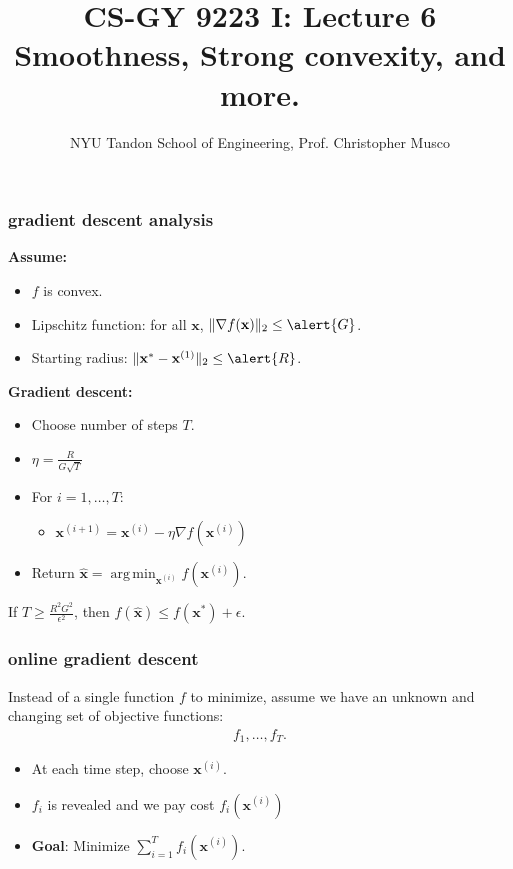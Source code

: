 \documentclass[compress]{beamer}
\title{CS-GY 9223 I: Lecture 6 \\ Smoothness, Strong convexity, and more.}
\author{NYU Tandon School of Engineering, Prof. Christopher Musco}
\date{}
\newcommand{\bv}[1]{\mathbf{#1}}
\DeclareMathOperator*{\argmin}{arg\,min}
\begin{document}
\begin{frame}
	\titlepage 
\end{frame}


\begin{frame}[t]
	\frametitle{gradient descent analysis}
	\textbf{Assume:}
	\begin{itemize}
		\item $f$ is convex.
		\item Lipschitz function: for all $\bv{x}$, $\|\nabla f(\bv{x})\|_2 \leq \alert{G}$.
		\item Starting radius: $\|\bv{x}^{*} - \bv{x}^{(1)}\|_2 \leq \alert{R}$.
	\end{itemize}
	
	\textbf{Gradient descent:}
	\begin{itemize}
		\item Choose number of steps $T$.
		\item $\eta = \frac{R}{G\sqrt{T}}$
		\item For $i = 1,\ldots, T$:
		\begin{itemize}
			\item $\bv{x}^{(i+1)} = \bv{x}^{(i)} - \eta \nabla f(\bv{x}^{(i)})$
		\end{itemize}
		\item Return $\hat{\bv{x}} = \argmin_{\bv{x}^{(i)}} f(\bv{x}^{(i)})$.
	\end{itemize}
	\begin{theorem}
	If $T \geq \frac{R^2G^2}{\epsilon^2}$, then $f(\hat{\bv{x}}) \leq f(\bv{x}^*) + \epsilon$.
	\end{theorem}
\end{frame}

\begin{frame}
	\frametitle{online gradient descent}
	Instead of a single function $f$ to minimize, assume we have an unknown and changing set of objective functions:
	\begin{align*}
	f_1, \ldots, f_T.
	\end{align*}
	\begin{itemize}
	\item At each time step, choose $\bv{x}^{(i)}$.
	\item $f_i$ is revealed and we pay cost $f_i(\bv{x}^{(i)})$
	\item \textbf{Goal}: Minimize $\sum_{i=1}^T f_i(\bv{x}^{(i)})$. 
	\end{itemize}
\end{frame}
\end{document}
